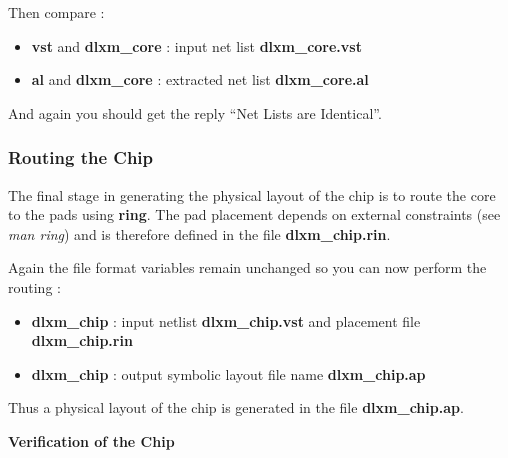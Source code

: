 Then compare :


\begin{itemize}
\item
{\bf vst} and {\bf dlxm\_core} : input net list {\bf dlxm\_core.vst}
\item
{\bf al} and {\bf dlxm\_core} : extracted net list {\bf dlxm\_core.al}
\end{itemize}

And again you should get the reply ``Net Lists are Identical''.



    		\subsubsection{Routing the Chip}

The final stage in generating the physical layout of the chip is to
route the core to the pads using {\bf ring}. The pad placement depends
on external constraints (see {\em man ring}) and is therefore defined
in the file {\bf dlxm\_chip.rin}.

Again the file format variables remain unchanged so you can now perform the routing :

\fbox {
\shortstack[l] {
\bf [$>$ setenv MBK\_WORK\_LIB . ]\\
\bf [$>$ setenv MBK\_CATAL\_NAME CATAL\\
\bf [$>$ setenv MBK\_CATA\_LIB ...]\\
\bf [$>$ setenv MBK\_IN\_LO vst]\\
\bf [$>$ setenv MBK\_IN\_PH ap]\\
\bf [$>$ setenv MBK\_OUT\_PH ap]\\
\bf $>$ ring dlxm\_chip dlxm\_chip
}
}

\begin{itemize}
\item
{\bf dlxm\_chip} : input netlist {\bf dlxm\_chip.vst} and placement
file {\bf dlxm\_chip.rin}
\item
{\bf dlxm\_chip} : output symbolic layout file name {\bf
dlxm\_chip.ap}
\end{itemize}

Thus a physical layout of the chip is generated in the file {\bf
dlxm\_chip.ap}.

 
{\bf Verification of the Chip}

